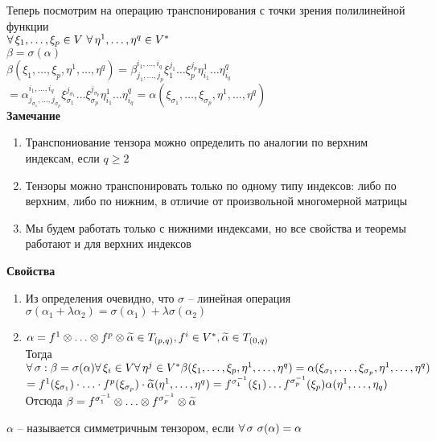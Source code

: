 \documentclass[12pt]{article}
\begin{document}
Теперь посмотрим на операцию транспонирования с точки зрения полилинейной функции\\
$\forall\, \xi_1, \ldots, \xi_p \in V\ \forall\, \eta^1,\ldots,\eta^q \in V^*$\\
$\beta=\sigma(\alpha)$\\
$\beta(\xi_1,\ldots,\xi_p,\eta^1,\ldots,\eta^q) = \beta^{i_1,\ldots,i_q}_{j_1,\ldots,j_p}\xi_1^{j_1}\ldots\xi_p^{j_p}\eta_{i_1}^1\ldots \eta_{i_q}^q$\\
$=\alpha^{i_1,\ldots,i_q}_{j_{\sigma_1},\ldots,j_{\sigma_p}}\xi_{\sigma_1}^{j_{\sigma_1}}\ldots\xi_{\sigma_p}^{j_{\sigma_p}}\eta_{i_1}^1\ldots \eta_{i_q}^q= \alpha(\xi_{\sigma_1},\ldots,\xi_{\sigma_p},\eta^1,\ldots,\eta^q)$\\
\textbf{Замечание}
\begin{enumerate}
    \item Транспониование тензора можно определить по аналогии по верхним индексам, если $q\geq 2$
    \item Тензоры можно транспонировать только по одному типу индексов: либо по верхним, либо по нижним, в отличие от произвольной многомерной матрицы
    \item Мы будем работать только с нижними индексами, но все свойства и теоремы работают и для верхних индексов
\end{enumerate}
\textbf{Свойства}
\begin{enumerate}
    \item Из определения очевидно, что $\sigma$ -- линейная операция\\
    $\sigma(\alpha_1 + \lambda\alpha_2) = \sigma(\alpha_1)+\lambda\sigma(\alpha_2)$
    \item $\alpha=f^1 \otimes \ldots \otimes f^p \otimes \widetilde \alpha \in T_{(p,q)}, f^i \in V^*, \widetilde\alpha \in T_{(0,q)}$\\
    Тогда $\forall\, \sigma: \beta=\sigma(\alpha) \forall\, \xi_i \in V \forall\, \eta^j \in V^* \beta(\xi_1,\ldots, \xi_p,\eta^1,\ldots,\eta^q)=\alpha(\xi_{\sigma_1},\ldots,\xi_{\sigma_p},\eta^1,\ldots,\eta^q)$\\
    $= f^1(\xi_{\sigma_1})\cdot \ldots \cdot f^p(\xi_{\sigma_p}) \cdot \widetilde \alpha(\eta^1,\ldots,\eta^q) = f^{\sigma^{-1}_1}(\xi_1)\ldots f^{\sigma^{-1}_p}(\xi_p) \alpha(\eta^1,\ldots,\eta_q)$\\
    Отсюда $\beta = f^{\sigma^{-1}_1} \otimes\ldots \otimes f^{\sigma^{-1}_p} \otimes \widetilde \alpha$
\end{enumerate}
$\alpha$ -- называется симметричным тензором, если $\forall\, \sigma\ \sigma(\alpha)=\alpha$\\
\end{document}
